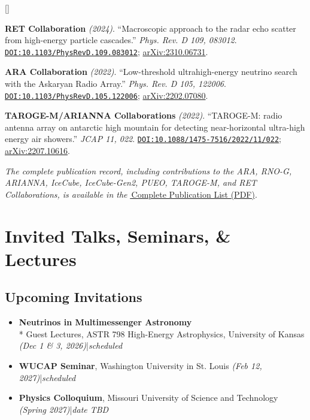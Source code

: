 \documentclass[10pt,letterpaper]{report}
\newcommand{\cvdate}[1]{{\normalfont\itshape\color{Muted}(#1)}}
\newcounter{cvitemrank}
\newenvironment{cvnumbered}[1]{%
  \setcounter{cvitemrank}{#1}%
  \begin{list}{\textcolor{Muted}{[\arabic{cvitemrank}]}}{%
    \setlength{\leftmargin}{2.25em}\setlength{\labelwidth}{1.65em}
    \setlength{\labelsep}{0.45em}\setlength{\itemindent}{0pt}
    \setlength{\itemsep}{0.3pt}\setlength{\topsep}{1.5pt}
    \setlength{\parsep}{0pt}\setlength{\partopsep}{0pt}}%
}{\end{list}}
\newcommand{\cvnumitem}{\item\addtocounter{cvitemrank}{-1}}
\newenvironment{cvpubnumbered}[1]{\begin{cvnumbered}{#1}\setlength{\itemsep}{2.2pt}\setlength{\topsep}{3pt}}{\end{cvnumbered}}
\newcommand{\doi}[1]{{\urlstyle{tt}\href{https://doi.org/#1}{\nolinkurl{DOI:#1}}}}
\newcommand{\arxiv}[1]{\href{https://arxiv.org/abs/#1}{arXiv:#1}}
\begin{document}
\begin{cvpubnumbered}{12}
    \cvnumitem \textbf{RET Collaboration} \cvdate{2024}. ``Macroscopic approach to the radar echo scatter from high-energy particle cascades.'' \textit{Phys. Rev. D 109, 083012}. \doi{10.1103/PhysRevD.109.083012}; \arxiv{2310.06731}.
    \cvnumitem \textbf{ARA Collaboration} \cvdate{2022}. ``Low-threshold ultrahigh-energy neutrino search with the Askaryan Radio Array.'' \textit{Phys. Rev. D 105, 122006}. \doi{10.1103/PhysRevD.105.122006}; \arxiv{2202.07080}.
    \cvnumitem \textbf{TAROGE-M/ARIANNA Collaborations} \cvdate{2022}. ``TAROGE-M: radio antenna array on antarctic high mountain for detecting near-horizontal ultra-high energy air showers.'' \textit{JCAP 11, 022}. \doi{10.1088/1475-7516/2022/11/022}; \arxiv{2207.10616}.
\end{cvpubnumbered}


\par\vspace{1.6ex}
\noindent\textit{The complete publication record, including contributions to the ARA, RNO-G, ARIANNA, IceCube, IceCube-Gen2, PUEO, TAROGE-M, and RET Collaborations, is available in the} 
\href{https://github.com/Mohammad-Neutrino/Publications/blob/trunk/Publications.pdf}{\faFilePdf\,Complete Publication List (PDF)}.




\par\endgroup

\section*{Invited Talks, Seminars, \& Lectures}
\subsection*{Upcoming Invitations}
\begin{itemize}
    \item \textbf{Neutrinos in Multimessenger Astronomy}\\*
    Guest Lectures, ASTR 798 High-Energy Astrophysics, University of Kansas \cvdate{Dec 1 \& 3, 2026}\enspace |\enspace\textit{scheduled}
    \item \textbf{WUCAP Seminar}, 
    Washington University in St. Louis \cvdate{Feb 12, 2027}\enspace |\enspace\textit{scheduled}
    \item \textbf{Physics Colloquium}, 
    Missouri University of Science and Technology \cvdate{Spring 2027}\enspace |\enspace\textit{date TBD}
\end{itemize}
\end{document}
